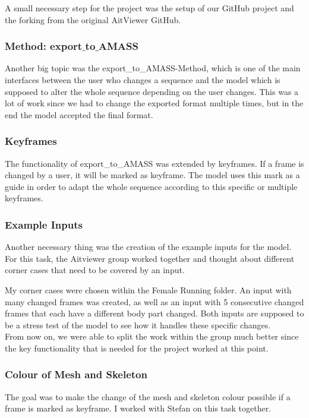 \documentclass[a4paper]{scrartcl}
\begin{document}
A small necessary step for the project was the setup of our GitHub project and the forking from the original AitViewer GitHub.

\subsubsection*{Method: export$\_$to$\_$AMASS}
Another big topic was the export\_to\_AMASS-Method, which is one of the main interfaces between the user who changes a sequence and the model which is supposed to alter the whole sequence depending on the user changes. This was a lot of work since we had to change the exported format multiple times, but in the end the model accepted the final format.

\subsubsection*{Keyframes}
The functionality of export\_to\_AMASS was extended by keyframes. If a frame is changed by a user, it will be marked as keyframe. The model uses this mark as a guide in order to adapt the whole sequence according to this specific or multiple keyframes.

\subsubsection*{Example Inputs}
Another necessary thing was the creation of the example inputs for the model. For this task, the Aitviewer group worked together and thought about different corner cases that need to be covered by an input. 

My corner cases were chosen within the Female Running folder. An input with many changed frames was created, as well as an input with 5 consecutive changed frames that each have a different body part changed. Both inputs are supposed to be a stress test of the model to see how it handles these specific changes.\\

From now on, we were able to split the work within the group much better since the key functionality that is needed for the project worked at this point. 

\subsubsection*{Colour of Mesh and Skeleton}
The goal was to make the change of the mesh and skeleton colour possible if a frame is marked as keyframe. I worked with Stefan on this task together.
\end{document}
